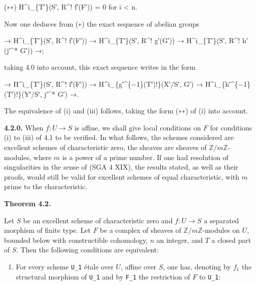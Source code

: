 \documentclass[
]{article}
\newenvironment{Shaded}{}{}
\newcommand{\NormalTok}[1]{#1}
\providecommand{\tightlist}{%
  \setlength{\itemsep}{0pt}\setlength{\parskip}{0pt}}
\begin{document}
\begin{Shaded}
\begin{Highlighting}[]
\NormalTok{(∗∗) H\^{}i\_\{T′\}(S′, R\^{}! f′(F′)) = 0 for i \textless{} n.}
\end{Highlighting}
\end{Shaded}

Now one deduces from (∗) the exact sequence of abelian groups

\begin{Shaded}
\begin{Highlighting}[]
\NormalTok{→ H\^{}i\_\{T′\}(S′, R\^{}! f′(F′)) → H\^{}i\_\{T′\}(S′, R\^{}! g′(G′)) → H\^{}i\_\{T′\}(S′, R\^{}! h′(j′\^{}* G′)) →;}
\end{Highlighting}
\end{Shaded}

taking 4.0 into account, this exact sequence writes in the form

\begin{Shaded}
\begin{Highlighting}[]
\NormalTok{→ H\^{}i\_\{T′\}(S′, R\^{}! f′(F′)) → H\^{}i\_\{g′\^{}\{−1\}(T′)!\}(X′/S′, G′) → H\^{}i\_\{h′\^{}\{−1\}(T′)!\}(Y′/S′, j′\^{}* G′) →.}
\end{Highlighting}
\end{Shaded}

The equivalence of (i) and (iii) follows, taking the form (∗∗) of (i)
into account.

\textbf{4.2.0.} When \(f : U \to S\) is affine, we shall give local
conditions on \(F\) for conditions (i) to (iii) of 4.1 to be verified.
In what follows, the schemes considered are excellent schemes of
characteristic zero, the sheaves are sheaves of
\(\mathbb{Z}/m\mathbb{Z}\)-modules, where \(m\) is a power of a prime
number. If one had resolution of singularities in the sense of (SGA 4
XIX), the results stated, as well as their proofs, would still be valid
for excellent schemes of equal characteristic, with \(m\) prime to the
characteristic.

\textbf{Theorem 4.2.}

Let \(S\) be an excellent scheme of characteristic zero and
\(f : U \to S\) a separated morphism of finite type. Let \(F\) be a
complex of sheaves of \(\mathbb{Z}/m\mathbb{Z}\)-modules on \(U\),
bounded below with constructible cohomology, \(n\) an integer, and \(T\)
a closed part of \(S\). Then the following conditions are equivalent:

\begin{enumerate}
\def\labelenumi{(\roman{enumi})}
\tightlist
\item
  For every scheme \texttt{U\_1} étale over \(U\), affine over \(S\),
  one has, denoting by \(f_{1}\) the structural morphism of
  \texttt{U\_1} and by \texttt{F\_1} the restriction of \(F\) to
  \texttt{U\_1}:
\end{enumerate}
\end{document}
